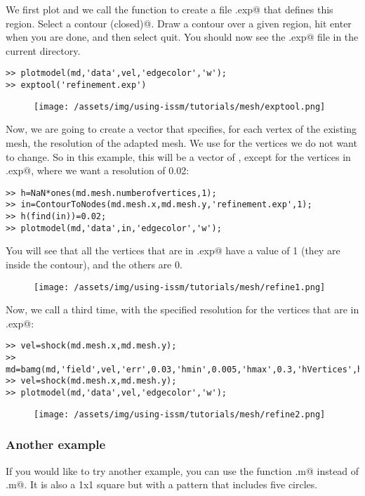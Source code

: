 We first plot \verb@vel@ and we call the function \verb@exptool@ to create a file \verb@refinement.exp@ that defines this region. Select \verb@add a contour (closed)@. Draw a contour over a given region, hit enter when you are done, and then select quit. You should now see the \verb@refinement.exp@ file in the current directory.
\begin{verbatim}>> plotmodel(md,'data',vel,'edgecolor','w');
>> exptool('refinement.exp')
\end{verbatim}
\begin{figure}[H]
	\begin{center}
		\texttt{[image: /assets/img/using-issm/tutorials/mesh/exptool.png]}
	\end{center}
\end{figure}

Now, we are going to create a vector that specifies, for each vertex of the existing mesh, the resolution of the adapted mesh. We use \verb@NaN@ for the vertices we do not want to change. So in this example, this will be a vector of \verb@NaN@, except for the vertices in \verb@refinement.exp@, where we want a resolution of 0.02:
\begin{verbatim}>> h=NaN*ones(md.mesh.numberofvertices,1);
>> in=ContourToNodes(md.mesh.x,md.mesh.y,'refinement.exp',1);
>> h(find(in))=0.02;
>> plotmodel(md,'data',in,'edgecolor','w');
\end{verbatim}
You will see that all the vertices that are in \verb@refinement.exp@ have a value of 1 (they are inside the contour), and the others are 0.
\begin{figure}[H]
	\begin{center}
		\texttt{[image: /assets/img/using-issm/tutorials/mesh/refine1.png]}
	\end{center}
\end{figure}

Now, we call \verb@bamg@ a third time, with the specified resolution for the vertices that are in \verb@refinement.exp@:
\begin{verbatim}>> vel=shock(md.mesh.x,md.mesh.y);
>> md=bamg(md,'field',vel,'err',0.03,'hmin',0.005,'hmax',0.3,'hVertices',h);
>> vel=shock(md.mesh.x,md.mesh.y);
>> plotmodel(md,'data',vel,'edgecolor','w');
\end{verbatim}
\begin{figure}[H]
	\begin{center}
		\texttt{[image: /assets/img/using-issm/tutorials/mesh/refine2.png]}
	\end{center}
\end{figure}
\subsubsection{Another example}%
If you would like to try another example, you can use the function \verb@circles.m@ instead of
\verb@shock.m@. It is also a 1x1 square but with a pattern that includes five circles.
